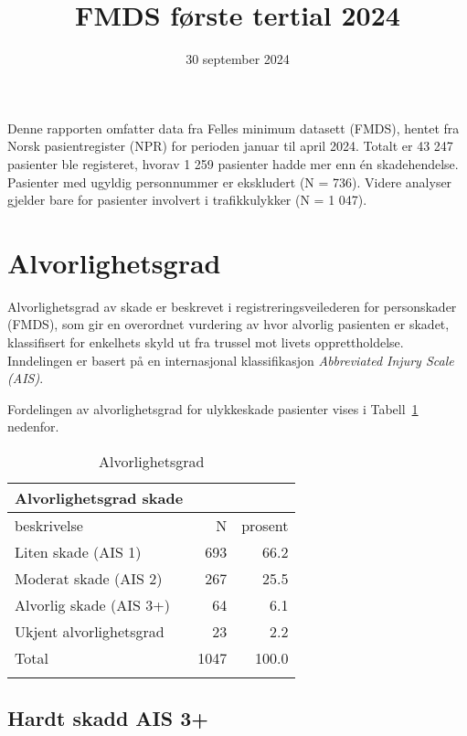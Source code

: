 \documentclass[
  letterpaper,
  DIV=11,
  numbers=noendperiod]{scrartcl}
\title{FMDS første tertial 2024}
\subtitle{30 september 2024}
\author{}
\date{}
\begin{document}
\maketitle


Denne rapporten omfatter data fra Felles minimum datasett (FMDS), hentet
fra Norsk pasientregister (NPR) for perioden januar til april 2024.
Totalt er 43 247 pasienter ble registeret, hvorav 1 259 pasienter hadde
mer enn én skadehendelse. Pasienter med ugyldig personnummer er
ekskludert (N = 736). Videre analyser gjelder bare for pasienter
involvert i trafikkulykker (N = 1 047).

\section{Alvorlighetsgrad}\label{alvorlighetsgrad}

Alvorlighetsgrad av skade er beskrevet i registreringsveilederen for
personskader (FMDS), som gir en overordnet vurdering av hvor alvorlig
pasienten er skadet, klassifisert for enkelhets skyld ut fra trussel mot
livets opprettholdelse. Inndelingen er basert på en internasjonal
klassifikasjon \emph{Abbreviated Injury Scale (AIS)}.

Fordelingen av alvorlighetsgrad for ulykkeskade pasienter vises i
Tabell~\ref{tbl-alvorlig} nedenfor.

\begingroup
\fontsize{12.0pt}{14.4pt}\selectfont

\begin{longtable}{lrr}


\caption*{
{\large Alvorlighetsgrad skade}
} \\ 
\toprule
beskrivelse & N & prosent \\ 
\midrule\addlinespace[2.5pt]
Liten skade (AIS 1) & 693 & 66.2 \\ 
Moderat skade (AIS 2) & 267 & 25.5 \\ 
Alvorlig skade (AIS 3+) & 64 & 6.1 \\ 
Ukjent alvorlighetsgrad & 23 & 2.2 \\ 
Total & 1047 & 100.0 \\ 
\bottomrule

\caption{\label{tbl-alvorlig}Alvorlighetsgrad}

\tabularnewline
\end{longtable}

\endgroup

\subsection{Hardt skadd AIS 3+}\label{hardt-skadd-ais-3}
\end{document}

